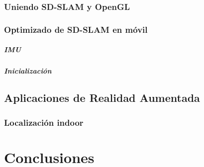 \documentclass[a4paper, 12pt]{book}
\begin{document}
\subsection{Uniendo SD-SLAM y OpenGL}
\label{subsec:sdslamyopengl}

\subsection{Optimizado de SD-SLAM en móvil}
\label{subsec:opmizacionsdslammovil}

\paragraph{IMU}
\label{subsec:imu}

\paragraph{Inicialización}
\label{subsec:inicializacion}

\section{Aplicaciones de Realidad Aumentada}
\label{sec:aplicacionesdesarrolladas}

\subsection{Localización indoor}
\label{sec:localizacionindoor}

\chapter{Conclusiones}
\label{sec:conclusiones}

\cleardoublepage

%
%  
\end{document}
